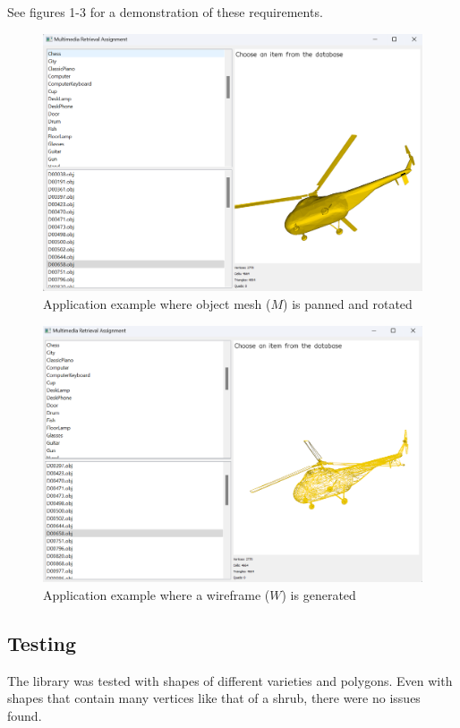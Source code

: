 \documentclass{article}
\begin{document}
See figures 1-3 for a demonstration of these requirements.
\begin{figure}[h]
    \centering
    \includegraphics[scale=0.3]{example_pan_rotate.png}
    \caption{Application example where object mesh ($M$) is panned and rotated}
\end{figure}

\begin{figure}[h]
    \centering
    \includegraphics[scale=0.3]{example_wireframe.png}
    \caption{Application example where a wireframe ($W$) is generated}
\end{figure}

\newpage
\subsection{Testing}
The library was tested with shapes of different varieties and polygons. Even with shapes that contain many vertices like that of a shrub, there were no issues found. 

\medskip

\small


\printbibliography
\end{document}
